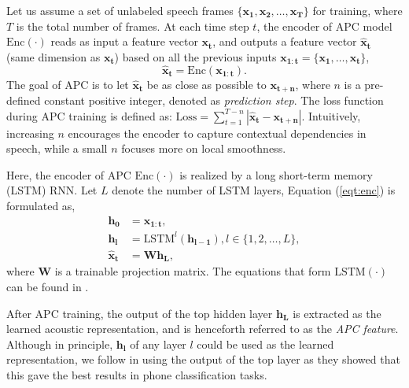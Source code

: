 \documentclass[a4paper]{article}
\begin{document}
Let us assume a set of unlabeled speech frames $\{\bm{x_1}, \bm{x_2}, \ldots, \bm{x_T}\}$ for training, where $T$ is the total number of frames. At each time step $t$, the encoder of APC model $\textrm{Enc} (\cdot)$ reads as input  a feature vector 
$\bm{x_t}$, 
and outputs  a feature vector  $\bm{\hat{x}_t}$ (same dimension as $\bm{x_t}$) based on all the previous inputs $\bm{x_{1:t}}=\{\bm{x_1},\ldots,\bm{x_t}\}$,
\begin{equation}
    \bm{\hat{x}_t} = \textrm{Enc} (\bm{x_{1:t}}).
    \label{eqt:enc}
\end{equation}
The goal of APC is to let $\bm{\hat{x}_t}$ be as close as possible to $\bm{x_{t+n}}$, where $n$ is a pre-defined constant positive integer, denoted as \textit{prediction step}. 
The loss function during APC   training is defined as: $\textrm{Loss} = \sum_{t=1}^{T-n} \left| \bm{\hat{x}_t} - \bm{x_{t+n}} \right|$.
Intuitively, increasing $n$ encourages the   encoder to capture contextual dependencies in speech, 
while a small $n$ focuses more on local smoothness.
 
Here, the encoder of APC $\mathrm{Enc} (\cdot)$ is realized by a long short-term memory (LSTM) \cite{hochreiter1997long} RNN. Let $L$ denote the number of LSTM layers,  Equation (\ref{eqt:enc}) is formulated as,
\begin{align}
    \bm{h_0} &= \bm{x_{1:t}},    \\
    \bm{h_l} &= \textrm{LSTM}^l (\bm{h_{l-1}}), l\in \{1,2,\ldots, L\}, \\
    \bm{\hat{x}_t} &= \bm{W} \bm{h_L},
\end{align}
where $\bm{W}$ is a trainable projection matrix. The equations that form  $\textrm{LSTM} (\cdot)$ can be found in \cite{sak2014long}. 

After APC training, the output of the top hidden layer $\bm{h_L}$ is extracted as the  learned acoustic representation, and is henceforth referred to as the  \textit{APC feature}. 
Although in principle,  $\bm{h_l}$ of any layer $l$ could be used as the learned representation, 
we follow \cite{Chung2019} in using the output of the top layer as they showed that this gave the best results in phone classification tasks.
\end{document}
